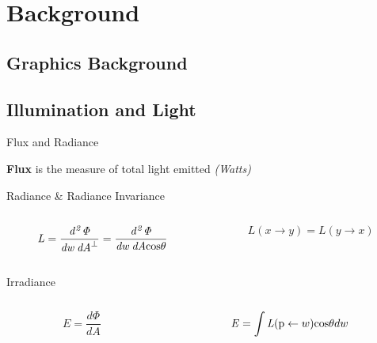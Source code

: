 \documentclass[10pt,compress,professionalfont]{beamer}
\begin{document}
\section{Background}
\subsection{Graphics Background}
\subsection{Illumination and Light}
\begin{frame}{Flux and Radiance}

    {\bf Flux} is the measure of total light emitted \textit{(Watts)}

    \begin{varblock}{Radiance \& Radiance Invariance}
        \begin{columns}
            \begin{column}{0.5\textwidth}
                    \[
                    \mathit{L} = \frac{\mathit{d^{2}\Phi}}{\mathit{dw\:dA}^\perp} = \frac{\mathit{d^{2}\Phi}}{\mathit{dw\:dA}\textup{cos}\theta}
                    \]
            \end{column}
            \begin{column}{0.5\textwidth}
                    \[
                        L(x \to y) = L(y \to x)
                    \]
            \end{column}
        \end{columns}
    \end{varblock}

    \begin{varblock}{Irradiance}
        \begin{columns}
            \begin{column}{0.5\textwidth}
                    \[
                    E = \frac{d\Phi}{dA}
                    \]
            \end{column}
            \begin{column}{0.5\textwidth}
                    \[
                        \mathit{E} = \int\mathit{L}(\textup{p} \leftarrow w)\textup{cos}\theta dw
                    \]
            \end{column}
        \end{columns}
    \end{varblock}



\end{frame}
\end{document}
